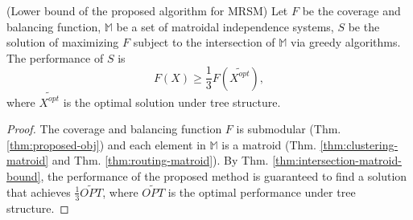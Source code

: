 \begin{theorem}  \label{def:proposed-bound}
 (Lower bound of the proposed algorithm for MRSM) Let $F$ be the coverage and balancing function, $\mathit{\mathbb{M}}$ be a set of matroidal independence systems, $S$ be the solution of maximizing $F$ subject to the intersection of $\mathit{\mathbb{M}}$ via greedy algorithms. The performance of $S$ is
\begin{equation*}
      F(X) \geq \frac{1}{3} F(\widetilde{X^{opt}}),
\end{equation*}
where $\widetilde{X^{opt}}$ is the optimal solution under tree structure.
\end{theorem}
\begin{proof}
The coverage and balancing function $F$ is submodular (Thm. \ref{thm:proposed-obj}) and each element in $\mathit{\mathbb{M}}$ is a matroid (Thm. \ref{thm:clustering-matroid} and Thm. \ref{thm:routing-matroid}).
By Thm. \ref{thm:intersection-matroid-bound}, the performance of the proposed method is guaranteed to find a solution that achieves $\frac{1}{3}\widetilde{OPT}$, where $\widetilde{OPT}$ is the optimal performance under tree structure.
\end{proof}

